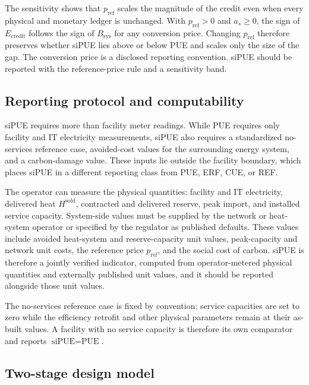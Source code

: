 \documentclass[preprint,12pt]{elsarticle}
\begin{document}
The sensitivity shows that $p_{\text{ref}}$ scales the magnitude of the credit even when every physical and monetary ledger is unchanged. With $p_{\text{ref}}>0$ and $a_s\ge0$, the sign of $E_{\text{credit}}$ follows the sign of $B_{\text{sys}}$ for any conversion price. Changing $p_{\text{ref}}$ therefore preserves whether siPUE lies above or below PUE and scales only the size of the gap. The conversion price is a disclosed reporting convention. siPUE should be reported with the reference-price rule and a sensitivity band.

\subsection{Reporting protocol and computability}
\label{sec:reporting-protocol}

siPUE requires more than facility meter readings. While PUE requires only facility and IT electricity measurements, siPUE also requires a standardized no-services reference case, avoided-cost values for the surrounding energy system, and a carbon-damage value. These inputs lie outside the facility boundary, which places siPUE in a different reporting class from PUE, ERF, CUE, or REF.

The operator can measure the physical quantities: facility and IT electricity, delivered heat $H^{\text{sold}}$, contracted and delivered reserve, peak import, and installed service capacity. System-side values must be supplied by the network or heat-system operator or specified by the regulator as published defaults. These values include avoided heat-system and reserve-capacity unit values, peak-capacity and network unit costs, the reference price $p_{\text{ref}}$, and the social cost of carbon. siPUE is therefore a jointly verified indicator, computed from operator-metered physical quantities and externally published unit values, and it should be reported alongside those unit values.

The no-services reference case is fixed by convention: service capacities are set to zero while the efficiency retrofit and other physical parameters remain at their as-built values. A facility with no service capacity is therefore its own comparator and reports $\text{siPUE}=\text{PUE}$.

\subsection{Two-stage design model}
\end{document}
